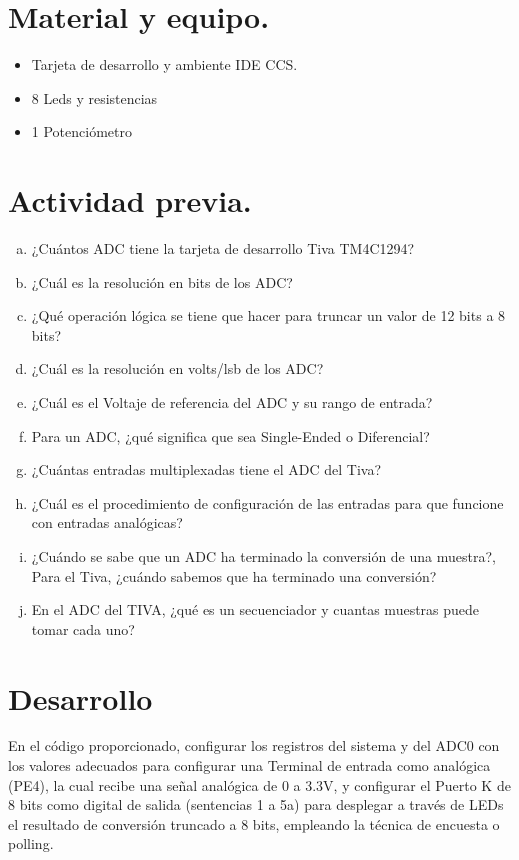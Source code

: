 \documentclass[a4paper,11pt]{article}                 %
\begin{document}
\section{Material y equipo.}
 
\begin{itemize}
	\item Tarjeta de desarrollo y ambiente IDE CCS. 
	\item 8 Leds y resistencias
	\item  1 Potenciómetro
\end{itemize}
  

  
\section{Actividad previa.}                   

  \begin{enumerate}[a)]
	\item ¿Cuántos ADC tiene la tarjeta de desarrollo Tiva TM4C1294?
	\item  ¿Cuál es la resolución en bits de los ADC? 
	\item ¿Qué operación lógica se tiene que hacer para truncar un valor de 12 bits a 8 bits? 
	\item ¿Cuál es la resolución en volts/lsb de los ADC?
	\item ¿Cuál es el Voltaje de referencia del ADC y su rango de entrada?
	\item Para un ADC, ¿qué significa que sea Single-Ended o Diferencial?
	\item ¿Cuántas entradas multiplexadas tiene el ADC del Tiva? 
	\item ¿Cuál es el procedimiento de configuración de las entradas para que funcione con entradas analógicas? 
	\item ¿Cuándo se sabe que un ADC ha terminado la conversión de una muestra?, Para el Tiva, ¿cuándo sabemos que ha terminado una conversión? 
	\item En el ADC del TIVA, ¿qué es un secuenciador y cuantas muestras puede tomar cada uno? 
	
	
\end{enumerate}

\section{Desarrollo}

En el código proporcionado, configurar los registros del sistema y del ADC0 con los valores adecuados para configurar una Terminal de entrada como analógica (PE4), la cual recibe una señal analógica de 0 a 3.3V, y configurar el Puerto K de 8 bits como digital de salida (sentencias 1 a 5a) para desplegar a través de LEDs el resultado de conversión truncado a 8 bits, empleando la técnica de encuesta o polling. 
\end{document}
